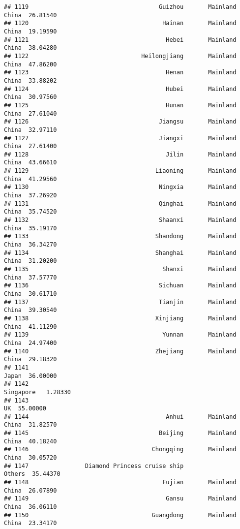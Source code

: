 \documentclass[
]{article}
\begin{document}
\begin{verbatim}
## 1119                                     Guizhou       Mainland China  26.81540
## 1120                                      Hainan       Mainland China  19.19590
## 1121                                       Hebei       Mainland China  38.04280
## 1122                                Heilongjiang       Mainland China  47.86200
## 1123                                       Henan       Mainland China  33.88202
## 1124                                       Hubei       Mainland China  30.97560
## 1125                                       Hunan       Mainland China  27.61040
## 1126                                     Jiangsu       Mainland China  32.97110
## 1127                                     Jiangxi       Mainland China  27.61400
## 1128                                       Jilin       Mainland China  43.66610
## 1129                                    Liaoning       Mainland China  41.29560
## 1130                                     Ningxia       Mainland China  37.26920
## 1131                                     Qinghai       Mainland China  35.74520
## 1132                                     Shaanxi       Mainland China  35.19170
## 1133                                    Shandong       Mainland China  36.34270
## 1134                                    Shanghai       Mainland China  31.20200
## 1135                                      Shanxi       Mainland China  37.57770
## 1136                                     Sichuan       Mainland China  30.61710
## 1137                                     Tianjin       Mainland China  39.30540
## 1138                                    Xinjiang       Mainland China  41.11290
## 1139                                      Yunnan       Mainland China  24.97400
## 1140                                    Zhejiang       Mainland China  29.18320
## 1141                                                            Japan  36.00000
## 1142                                                        Singapore   1.28330
## 1143                                                               UK  55.00000
## 1144                                       Anhui       Mainland China  31.82570
## 1145                                     Beijing       Mainland China  40.18240
## 1146                                   Chongqing       Mainland China  30.05720
## 1147                Diamond Princess cruise ship               Others  35.44370
## 1148                                      Fujian       Mainland China  26.07890
## 1149                                       Gansu       Mainland China  36.06110
## 1150                                   Guangdong       Mainland China  23.34170

\end{verbatim}
\end{document}
